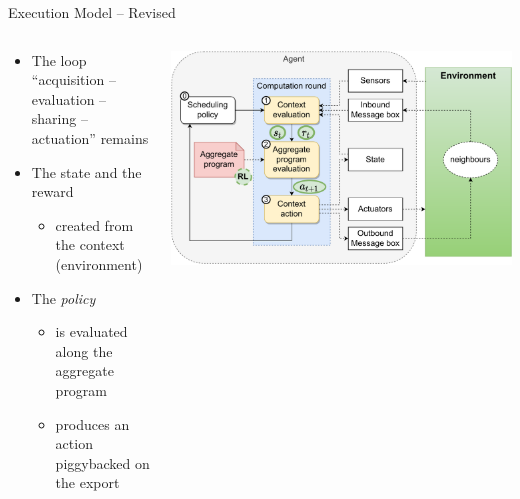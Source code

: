 \documentclass[8pt, aspectratio=169, handout]{beamer}
\begin{document}
\begin{frame}{Execution Model -- Revised}
  \begin{columns}
    \begin{column}{0.49\textwidth}
      \begin{card}
        \begin{itemize}
          \item The loop ``acquisition -- evaluation -- sharing -- actuation'' remains
          \item The state and the reward
          \begin{itemize}
            \item created from the context (environment)
          \end{itemize}
          \item The \emph{policy}
          \begin{itemize}
            \item is evaluated along the aggregate program
            \item produces an action piggybacked on the export
          \end{itemize}
        \end{itemize}
      \end{card}
    \end{column}
    \begin{column}{0.57\textwidth}  
      \begin{cardTiny}
        \includegraphics[width=\textwidth]{img/aggregate-agent-control-architecture-rl.pdf}    
      \end{cardTiny}
    \end{column}
  \end{columns}
\end{frame}
\end{document}
